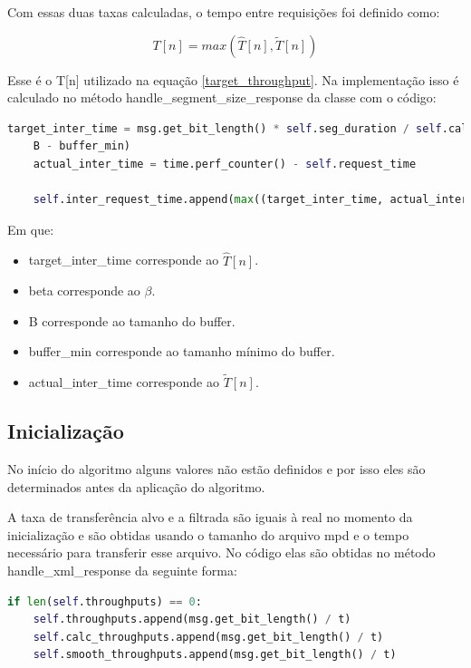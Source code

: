 \documentclass[10pt,twocolumn,letterpaper]{article}
\begin{document}
Com essas duas taxas calculadas, o tempo entre requisições foi definido como:

\begin{equation}
	T[n] = max(\hat{T}[n], \tilde{T}[n])
\end{equation}

Esse é o T[n] utilizado na equação \ref{target_throughput}. Na implementação isso é calculado no método handle\_segment\_size\_response da classe com o código:

\begin{lstlisting}[language=python]
	target_inter_time = msg.get_bit_length() * self.seg_duration / self.calc_throughputs[-1] + beta * (
	B - buffer_min)
	actual_inter_time = time.perf_counter() - self.request_time
	
	self.inter_request_time.append(max((target_inter_time, actual_inter_time))) 
\end{lstlisting}

Em que:

\begin{itemize}
	\item target\_inter\_time corresponde ao $\hat{T}[n]$.
	\item beta corresponde ao $\beta$.
	\item B corresponde ao tamanho do buffer.
	\item buffer\_min corresponde ao tamanho mínimo do buffer.
	\item actual\_inter\_time corresponde ao $\tilde{T}[n]$.
\end{itemize}

\subsection{Inicialização}
No início do algoritmo alguns valores não estão definidos e por isso eles são determinados antes da aplicação do algoritmo.

A taxa de transferência alvo e a filtrada são iguais à real no momento da inicialização e são obtidas usando o tamanho do arquivo mpd e o tempo necessário para transferir esse arquivo. No código elas são obtidas no método handle\_xml\_response da seguinte forma:

\begin{lstlisting}[language=python]
	if len(self.throughputs) == 0:
	self.throughputs.append(msg.get_bit_length() / t)
	self.calc_throughputs.append(msg.get_bit_length() / t)
	self.smooth_throughputs.append(msg.get_bit_length() / t)
\end{lstlisting}
\end{document}

